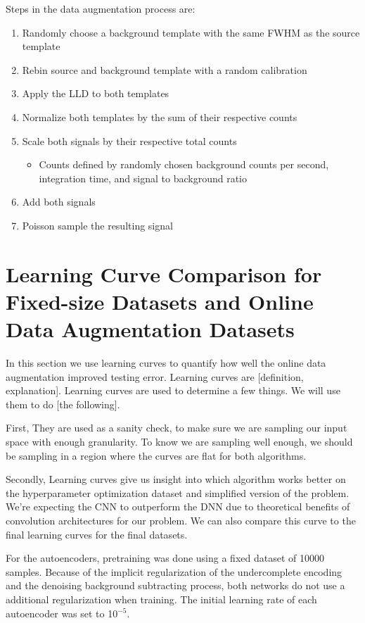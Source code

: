 Steps in the data augmentation process are:
\begin{enumerate}
  \item Randomly choose a background template with the same FWHM as the source template
  \item Rebin source and background template with a random calibration
  \item Apply the LLD to both templates
  \item Normalize both templates by the sum of their respective counts 
  \item Scale both signals by their respective total counts
  \begin{itemize}
     \item Counts defined by randomly chosen background counts per second, integration time, and signal to background ratio
   \end{itemize}
  \item Add both signals 
  \item Poisson sample the resulting signal
\end{enumerate}


\section{Learning Curve Comparison for Fixed-size Datasets and Online Data Augmentation Datasets}

In this section we use learning curves to quantify how well the online data augmentation improved testing error. Learning curves are [definition, explanation]. Learning curves are used to determine a few things. We will use them to do [the following].

First, They are used as a sanity check, to make sure we are sampling our input space with enough granularity. To know we are sampling well enough, we should be sampling in a region where the curves are flat for both algorithms.

Secondly, Learning curves give us insight into which algorithm works better on the hyperparameter optimization dataset and simplified version of the problem. We're expecting the CNN to outperform the DNN due to theoretical benefits of convolution architectures for our problem. We can also compare this curve to the final learning curves for the final datasets.

For the autoencoders, pretraining was done using a fixed dataset of 10000 samples. Because of the implicit regularization of the undercomplete encoding and the denoising background subtracting process, both networks do not use a additional regularization when training. The initial learning rate of each autoencoder was set to 10$^{-5}$.


